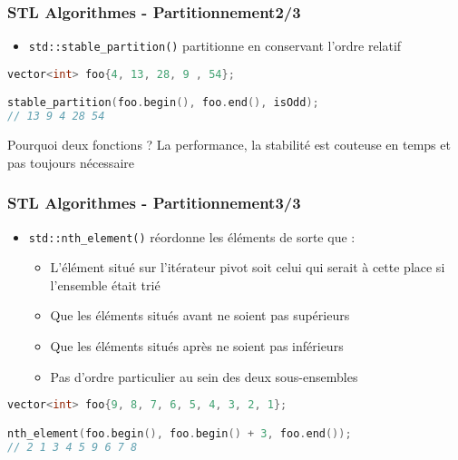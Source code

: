 \documentclass[C++.tex]{subfiles}
\begin{document}
\begin{frame}[fragile]
	\frametitle{STL Algorithmes - Partitionnement\titlehfill{}2/3}
	\begin{itemize}
		\item \lstinline|std::stable_partition()| partitionne en conservant l'ordre relatif
	\end{itemize}

	\begin{lstlisting}[language=C++]
vector<int> foo{4, 13, 28, 9 , 54};

stable_partition(foo.begin(), foo.end(), isOdd);
// 13 9 4 28 54\end{lstlisting}

	\pause

	\begin{block}{Pourquoi deux fonctions ?}
		La performance, la stabilité est couteuse en temps et pas toujours nécessaire
	\end{block}
\end{frame}

\begin{frame}[fragile]
	\frametitle{STL Algorithmes - Partitionnement\titlehfill{}3/3}
	\begin{itemize}
		\item \lstinline|std::nth_element()| réordonne les éléments de sorte que :
		\begin{itemize}
			\item L'élément situé sur l'itérateur pivot soit celui qui serait à cette place si l'ensemble était trié
			\item Que les éléments situés avant ne soient pas supérieurs
			\item Que les éléments situés après ne soient pas inférieurs
			\item Pas d'ordre particulier au sein des deux sous-ensembles
		\end{itemize}
	\end{itemize}


	\begin{lstlisting}[language=C++]
vector<int> foo{9, 8, 7, 6, 5, 4, 3, 2, 1};

nth_element(foo.begin(), foo.begin() + 3, foo.end());
// 2 1 3 4 5 9 6 7 8\end{lstlisting}
\end{frame}
\end{document}
